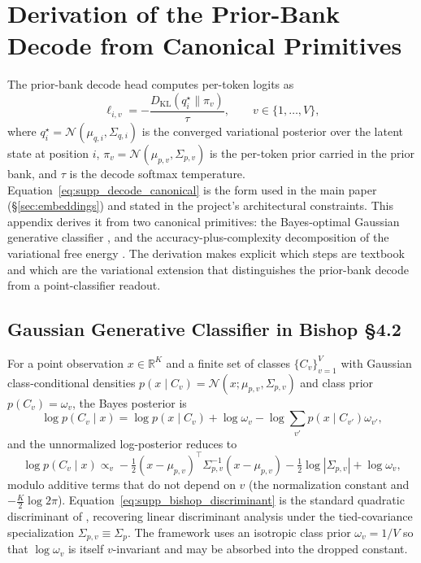 \documentclass[twoside,11pt]{article}
\begin{document}
\section{Derivation of the Prior-Bank Decode from Canonical Primitives}
\label{sec:supp_decode_derivation}

The prior-bank decode head computes per-token logits as
\begin{equation}
\ell_{i,v} = -\frac{D_{\mathrm{KL}}(q_i^{\star} \| \pi_v)}{\tau},
\qquad
v \in \{1,\dots,V\},
\label{eq:supp_decode_canonical}
\end{equation}
where $q_i^{\star} = \mathcal{N}(\mu_{q,i}, \Sigma_{q,i})$ is the converged variational posterior over the latent state at position $i$, $\pi_v = \mathcal{N}(\mu_{p,v}, \Sigma_{p,v})$ is the per-token prior carried in the prior bank, and $\tau$ is the decode softmax temperature. Equation~\eqref{eq:supp_decode_canonical} is the form used in the main paper (\S\ref{sec:embeddings}) and stated in the project's architectural constraints. This appendix derives it from two canonical primitives: the Bayes-optimal Gaussian generative classifier \cite[\S4.2]{Bishop2006}, and the accuracy-plus-complexity decomposition of the variational free energy \cite{Friston2010,Blei2017}. The derivation makes explicit which steps are textbook and which are the variational extension that distinguishes the prior-bank decode from a point-classifier readout.

\subsection{Gaussian Generative Classifier in Bishop \S4.2}

For a point observation $x \in \mathbb{R}^K$ and a finite set of classes $\{C_v\}_{v=1}^V$ with Gaussian class-conditional densities $p(x \mid C_v) = \mathcal{N}(x;\mu_{p,v}, \Sigma_{p,v})$ and class prior $p(C_v) = \omega_v$, the Bayes posterior is
\begin{equation}
\log p(C_v \mid x)
= \log p(x \mid C_v) + \log \omega_v - \log \sum_{v'} p(x \mid C_{v'}) \omega_{v'},
\label{eq:supp_bishop_bayes}
\end{equation}
and the unnormalized log-posterior reduces to
\begin{equation}
\log p(C_v \mid x) \propto_v -\tfrac{1}{2}(x - \mu_{p,v})^{\top} \Sigma_{p,v}^{-1} (x - \mu_{p,v})
- \tfrac{1}{2}\log|\Sigma_{p,v}|
+ \log \omega_v,
\label{eq:supp_bishop_discriminant}
\end{equation}
modulo additive terms that do not depend on $v$ (the normalization constant and $-\tfrac{K}{2}\log 2\pi$). Equation~\eqref{eq:supp_bishop_discriminant} is the standard quadratic discriminant of \cite[\S4.2.1]{Bishop2006}, recovering linear discriminant analysis under the tied-covariance specialization $\Sigma_{p,v} \equiv \Sigma_p$. The framework uses an isotropic class prior $\omega_v = 1/V$ so that $\log \omega_v$ is itself $v$-invariant and may be absorbed into the dropped constant.
\end{document}
